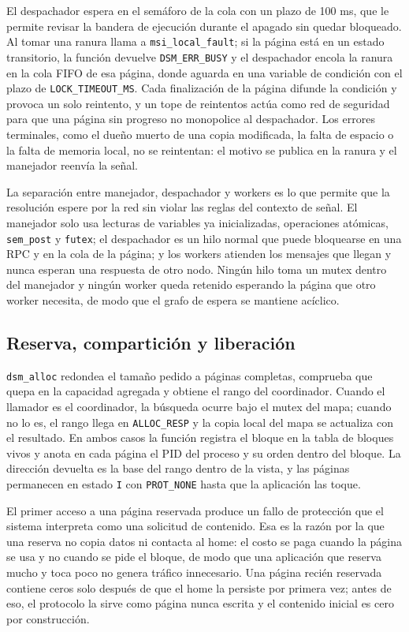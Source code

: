 El despachador espera en el semáforo de la cola con un plazo de 100 ms, que le permite revisar la bandera de ejecución durante el apagado sin quedar bloqueado. Al tomar una ranura llama a \texttt{msi\_local\_fault}; si la página está en un estado transitorio, la función devuelve \texttt{DSM\_ERR\_BUSY} y el despachador encola la ranura en la cola FIFO de esa página, donde aguarda en una variable de condición con el plazo de \texttt{LOCK\_TIMEOUT\_MS}. Cada finalización de la página difunde la condición y provoca un solo reintento, y un tope de reintentos actúa como red de seguridad para que una página sin progreso no monopolice al despachador. Los errores terminales, como el dueño muerto de una copia modificada, la falta de espacio o la falta de memoria local, no se reintentan: el motivo se publica en la ranura y el manejador reenvía la señal.

La separación entre manejador, despachador y workers es lo que permite que la resolución espere por la red sin violar las reglas del contexto de señal. El manejador solo usa lecturas de variables ya inicializadas, operaciones atómicas, \texttt{sem\_post} y \texttt{futex}; el despachador es un hilo normal que puede bloquearse en una RPC y en la cola de la página; y los workers atienden los mensajes que llegan y nunca esperan una respuesta de otro nodo. Ningún hilo toma un mutex dentro del manejador y ningún worker queda retenido esperando la página que otro worker necesita, de modo que el grafo de espera se mantiene acíclico.

\subsection{Reserva, compartición y liberación}\label{sec:reserva-comparticion}

\texttt{dsm\_alloc} redondea el tamaño pedido a páginas completas, comprueba que quepa en la capacidad agregada y obtiene el rango del coordinador. Cuando el llamador es el coordinador, la búsqueda ocurre bajo el mutex del mapa; cuando no lo es, el rango llega en \texttt{ALLOC\_RESP} y la copia local del mapa se actualiza con el resultado. En ambos casos la función registra el bloque en la tabla de bloques vivos y anota en cada página el PID del proceso y su orden dentro del bloque. La dirección devuelta es la base del rango dentro de la vista, y las páginas permanecen en estado \texttt{I} con \texttt{PROT\_NONE} hasta que la aplicación las toque.

El primer acceso a una página reservada produce un fallo de protección que el sistema interpreta como una solicitud de contenido. Esa es la razón por la que una reserva no copia datos ni contacta al home: el costo se paga cuando la página se usa y no cuando se pide el bloque, de modo que una aplicación que reserva mucho y toca poco no genera tráfico innecesario. Una página recién reservada contiene ceros solo después de que el home la persiste por primera vez; antes de eso, el protocolo la sirve como página nunca escrita y el contenido inicial es cero por construcción.

